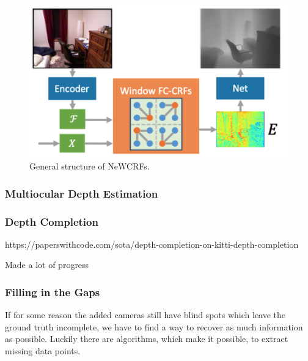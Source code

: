 \begin{figure}
    \centering
    \includegraphics[width=\linewidth]{figures/Monocular_depth/new.png}
    \caption{General structure of NeWCRFs.}
    \label{fig:new}
\end{figure}

\subsubsection{Multiocular Depth Estimation}

\cite{multiview_depthestimation_epipolar, multiview_depthestimation_fusion}

\cite{multiview_depthestimation_RealSense_and_any}

\subsubsection{Depth Completion}

https://paperswithcode.com/sota/depth-completion-on-kitti-depth-completion

\cite{depthcompletion_FusionNet, depthcompletion_NLSPN, depthcompletion_PENet, depthcompletion_SemAttNet}

Made a lot of progress

\fi

\subsubsection{Filling in the Gaps}

If for some reason the added cameras still have blind spots which leave the ground truth incomplete, we have to find a way to recover as much information as possible. Luckily there are algorithms, which make it possible, to extract missing data points.

